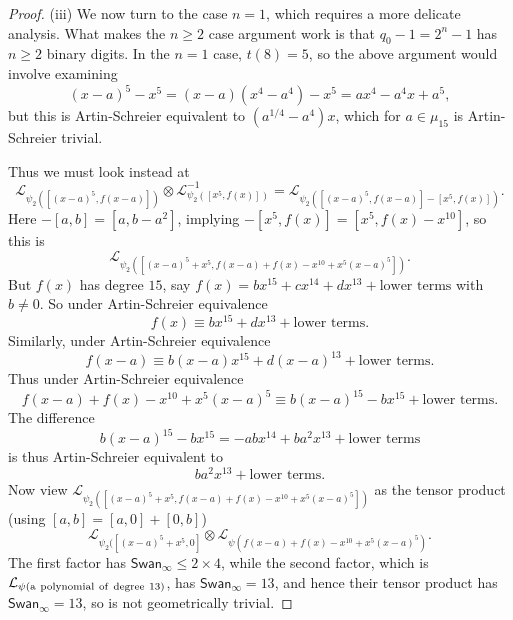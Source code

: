 \documentclass[11pt]{amsart}
\theoremstyle{plain}
\theoremstyle{definition}
\numberwithin{thm}{section}
\numberwithin{equation}{thm}
\newcommand{\Swan}{\mathsf {Swan}}
\newcommand{\sL}{{\mathcal L}}
\newcommand{\0}{\emptyset}
\begin{document}
\begin{proof}
  
\smallskip  
(iii)  We now turn to the case $n=1$, which requires a more delicate analysis. What makes the $n \ge 2$ case argument work is that $q_0-1 =2^n-1$ has $n \ge 2$ binary digits. In the $n=1$ case, $t(8)=5$, so the above argument would involve examining
  $$(x-a)^5 -x^5 = (x-a)(x^4-a^4) -x^5 =ax^4-a^4x +a^5,$$
but this is  Artin-Schreier equivalent to $(a^{1/4}-a^4)x$, which for $a \in \mu_{15}$ is Artin-Schreier trivial.
  
  Thus we must look instead at 
  $$ \sL_{\psi_2([(x-a)^{5},f(x-a)])}\otimes \sL_{\psi_2([x^{5},f(x)])}^{-1}= \sL_{\psi_2([(x-a)^{5},f(x-a)]-[x^{5},f(x)])}.$$
  Here $-[a,b]=[a,b-a^2]$, implying $-[x^{5},f(x)]=[x^5,f(x)-x^{10}]$, so this is
  $$ \sL_{\psi_2([(x-a)^{5}+x^{5},f(x-a)+f(x) -x^{10} +x^5(x-a)^5])}.$$
  But $f(x)$ has degree $15$, say $f(x)=bx^{15} + cx^{14} +dx^{13} + \mbox{lower terms}$
  with $b \neq 0$.
So under Artin-Schreier equivalence %
  $$f(x) \equiv bx^{15} + dx^{13 }+ \mbox{lower terms}.$$
  Similarly, under Artin-Schreier equivalence %
  $$f(x-a)\equiv b(x-a)x^{15} + d(x-a)^{13} + \mbox{lower terms}.$$
  Thus under Artin-Schreier equivalence %
  $$f(x-a)+f(x) -x^{10} +x^5(x-a)^5 \equiv b(x-a)^{15}-bx^{15} + \mbox{lower terms}.$$
  The difference $$b(x-a)^{15}-bx^{15} =-abx^{14} +ba^2x^{13}+ \mbox{lower terms}$$
  is thus Artin-Schreier equivalent to
  $$ba^2x^{13}+ \mbox{lower terms}.$$
  Now view $\sL_{\psi_2([(x-a)^{5}+x^{5},f(x-a)+f(x) -x^{10} +x^5(x-a)^5])}$ as the tensor product (using $ [a,b]=[a,0]+[0,b]$)
  $$\sL_{\psi_2([(x-a)^{5}+x^{5},0]}\otimes \sL_{\psi(f(x-a)+f(x) -x^{10} +x^5(x-a)^5)}.$$
  The first factor has $\Swan_\infty \le 2 \times 4$, while the second factor, which is $\sL_{\psi({\rm a \ polynomial\  of \  degree\ }13)}$, has
  $\Swan_\infty=13$, and hence their tensor product has $\Swan_\infty=13$, so is not geometrically trivial.
 \end{proof}
  
\end{document}
